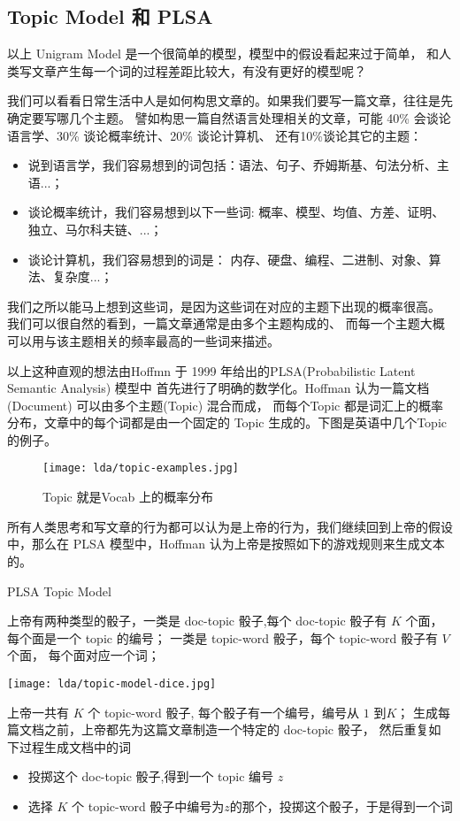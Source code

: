 \subsection{Topic Model 和 PLSA}
以上 Unigram Model 是一个很简单的模型，模型中的假设看起来过于简单，
和人类写文章产生每一个词的过程差距比较大，有没有更好的模型呢？

我们可以看看日常生活中人是如何构思文章的。如果我们要写一篇文章，往往是先确定要写哪几个主题。
譬如构思一篇自然语言处理相关的文章，可能 40\% 会谈论语言学、30\% 谈论概率统计、20\% 谈论计算机、
还有10\%谈论其它的主题：
\begin{itemize}
\item 说到语言学，我们容易想到的词包括：语法、句子、乔姆斯基、句法分析、主语...；
\item 谈论概率统计，我们容易想到以下一些词: 概率、模型、均值、方差、证明、独立、马尔科夫链、...；
\item 谈论计算机，我们容易想到的词是： 内存、硬盘、编程、二进制、对象、算法、复杂度...；
\end{itemize}
我们之所以能马上想到这些词，是因为这些词在对应的主题下出现的概率很高。
我们可以很自然的看到，一篇文章通常是由多个主题构成的、
而每一个主题大概可以用与该主题相关的频率最高的一些词来描述。

以上这种直观的想法由Hoffmn 于 1999 年给出的PLSA(Probabilistic Latent Semantic Analysis) 模型中
首先进行了明确的数学化。Hoffman 认为一篇文档(Document) 可以由多个主题(Topic) 混合而成， 而每个Topic 都是词汇上的概率分布，文章中的每个词都是由一个固定的 Topic 生成的。下图是英语中几个Topic 的例子。
\begin{figure}[htbp]
\centering
\texttt{[image: lda/topic-examples.jpg]}
\caption{Topic 就是Vocab 上的概率分布}
\end{figure}

所有人类思考和写文章的行为都可以认为是上帝的行为，我们继续回到上帝的假设中，那么在 PLSA 模型中，Hoffman 认为上帝是按照如下的游戏规则来生成文本的。
\begin{algorithm}[htb]
\caption{PLSA Topic Model }
\begin{algorithmic}[1]
\STATE 上帝有两种类型的骰子，一类是 doc-topic 骰子,每个 doc-topic 骰子有 $K$ 个面，每个面是一个 topic 的编号；
一类是 topic-word 骰子，每个 topic-word 骰子有 $V$ 个面， 每个面对应一个词；
\begin{center}
\texttt{[image: lda/topic-model-dice.jpg]}
\end{center}

\STATE 上帝一共有 $K$ 个 topic-word 骰子, 每个骰子有一个编号，编号从 $1$ 到$K$；
\STATE 生成每篇文档之前，上帝都先为这篇文章制造一个特定的 doc-topic 骰子，
然后重复如下过程生成文档中的词
\begin{itemize}
\item 投掷这个 doc-topic 骰子,得到一个 topic 编号 $z$
\item 选择 $K$ 个 topic-word 骰子中编号为$z$的那个，投掷这个骰子，于是得到一个词
\end{itemize}
\end{algorithmic}
\end{algorithm}

